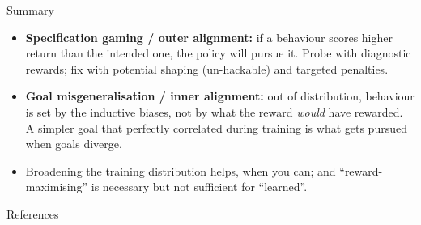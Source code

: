 
\begin{frame}{Summary}
\begin{itemize}
  \item \textbf{Specification gaming / outer alignment:} if a behaviour scores higher return than the intended one, the policy will pursue it. Probe with diagnostic rewards; fix with potential shaping (un-hackable) and targeted penalties.
  \pause
  \item \textbf{Goal misgeneralisation / inner alignment:} out of distribution, behaviour is set by the inductive biases, not by what the reward \emph{would} have rewarded. A simpler goal that perfectly correlated during training is what gets pursued when goals diverge.
  \pause
  \item Broadening the training distribution helps, when you can; and ``reward-maximising'' is necessary but not sufficient for ``learned''.
\end{itemize}
\end{frame}

\begin{frame}[allowframebreaks]{References}
\footnotesize


\nocite{Langosco:22goalmisgen, Shah:22goalmisgen, Ng:99shaping}
\end{frame}


